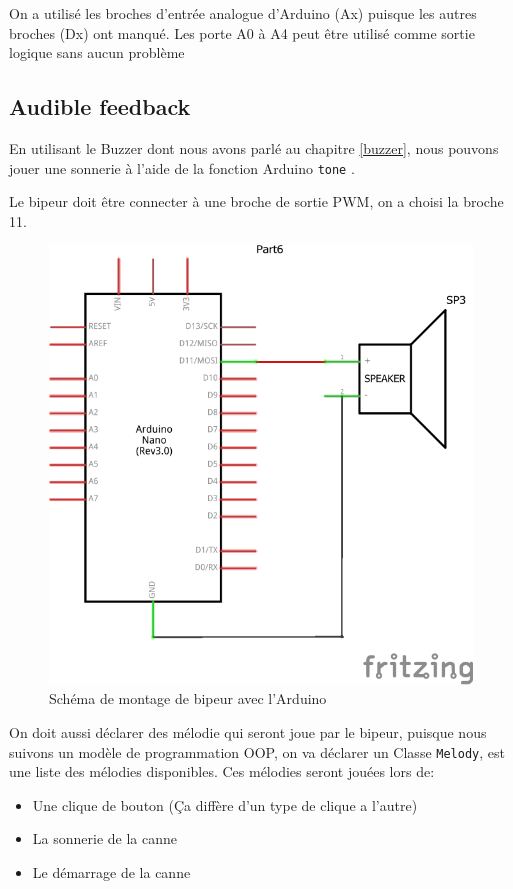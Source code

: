 \FloatBarrier

On a utilisé les broches d'entrée analogue d'Arduino (Ax) puisque les autres broches (Dx) ont manqué. Les porte A0 à A4 peut être utilisé comme sortie logique sans aucun problème

\subsection{Audible feedback}
En utilisant le Buzzer dont nous avons parlé au chapitre \ref{buzzer}, nous pouvons jouer une sonnerie à l’aide de la fonction Arduino \verb|tone| \cite{arduino-tone}.

Le bipeur doit être connecter à une broche de sortie \acrshort{PWM}, on a choisi la broche 11.

\begin{figure}[!htbp]
    \centering
    \includegraphics[width=.6\linewidth]{assets/buzzer circuit.png}
    \caption{Schéma de montage de bipeur avec l'Arduino}
\end{figure}

\FloatBarrier

On doit aussi déclarer des mélodie qui seront joue par le bipeur, puisque nous suivons un modèle de programmation \acrshort{OOP}, on va déclarer un Classe \verb|Melody|, est une liste des mélodies disponibles.
Ces mélodies seront jouées lors de:
\begin{itemize}
    \item Une clique de bouton (Ça diffère d'un type de clique a l'autre)
    \item La sonnerie de la canne
    \item Le démarrage de la canne
\end{itemize}

